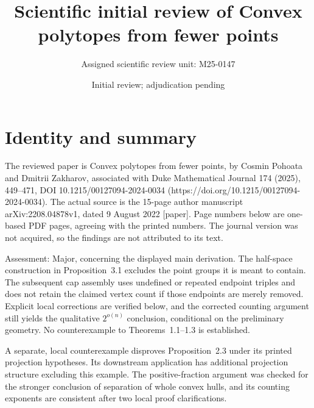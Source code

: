 \documentclass[10pt]{article}
\title{Scientific initial review of
Convex polytopes from fewer points}
\author{Assigned scientific review unit: M25-0147}
\date{Initial review; adjudication pending}
\begin{document}
\maketitle
\section*{Identity and summary}
The reviewed paper is Convex polytopes from fewer points, by Cosmin Pohoata and Dmitrii Zakharov, associated with Duke Mathematical Journal 174 (2025), 449–471, DOI 10.1215/00127094-2024-0034 (https://doi.org/10.1215/00127094-2024-0034). The actual source is the 15-page author manuscript arXiv:2208.04878v1, dated 9 August 2022 [paper]. Page numbers below are one-based PDF pages, agreeing with the printed numbers. The journal version was not acquired, so the findings are not attributed to its text.\par
Assessment: Major, concerning the displayed main derivation. The half-space construction in Proposition 3.1 excludes the point groups it is meant to contain. The subsequent cap assembly uses undefined or repeated endpoint triples and does not retain the claimed vertex count if those endpoints are merely removed. Explicit local corrections are verified below, and the corrected counting argument still yields the qualitative \(2^{o(n)}\) conclusion, conditional on the preliminary geometry. No counterexample to Theorems 1.1–1.3 is established.\par
A separate, local counterexample disproves Proposition 2.3 under its printed projection hypotheses. Its downstream application has additional projection structure excluding this example. The positive-fraction argument was checked for the stronger conclusion of separation of whole convex hulls, and its counting exponents are consistent after two local proof clarifications.\par
\end{document}
